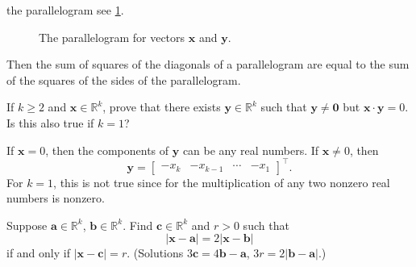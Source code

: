 \begin{exercise}
  the parallelogram see \cref{ch1prob17}.
  \begin{figure}[H]
    \centering
    
    \caption{The parallelogram for vectors \(\mathbold{x}\) and
      \(\mathbold{y}\).}
    \label{ch1prob17}
  \end{figure}
  Then the sum of squares of the diagonals of a parallelogram are equal to the
  sum of the squares of the sides of the parallelogram.
\item
  If \(k\geq 2\) and \(\mathbold{x}\in\mathbb{R}^k\), prove that there exists
  \(\mathbold{y}\in\mathbb{R}^k\) such that \(\mathbold{y}\neq\mathbold{0}\)
  but \(\mathbold{x}\cdot\mathbold{y} = 0\).
  Is this also true if \(k = 1\)?
  \par\smallskip
  If \(\mathbold{x} = 0\), then the components of \(\mathbold{y}\) can be any
  real numbers.
  If \(\mathbold{x}\neq 0\), then
  \[
  \mathbold{y} =
  \begin{bmatrix}
    -x_k & -x_{k - 1} & \cdots & -x_1
  \end{bmatrix}^{\intercal}.
  \]
  For \(k = 1\), this is not true since for the multiplication of any two
  nonzero real numbers is nonzero.
\item
  Suppose \(\mathbold{a}\in\mathbb{R}^k\), \(\mathbold{b}\in\mathbb{R}^k\).
  Find \(\mathbold{c}\in\mathbb{R}^k\) and \(r > 0\) such that
  \[
  \lvert\mathbold{x} - \mathbold{a}\rvert = 2\lvert\mathbold{x} - \mathbold{b}\rvert
  \]
  if and only if \(\lvert\mathbold{x} - \mathbold{c}\rvert = r\).
  (Solutions \(3\mathbold{c} = 4\mathbold{b} - \mathbold{a}\),
  \(3r = 2\lvert\mathbold{b} - \mathbold{a}\rvert\).)
\end{exercise}
